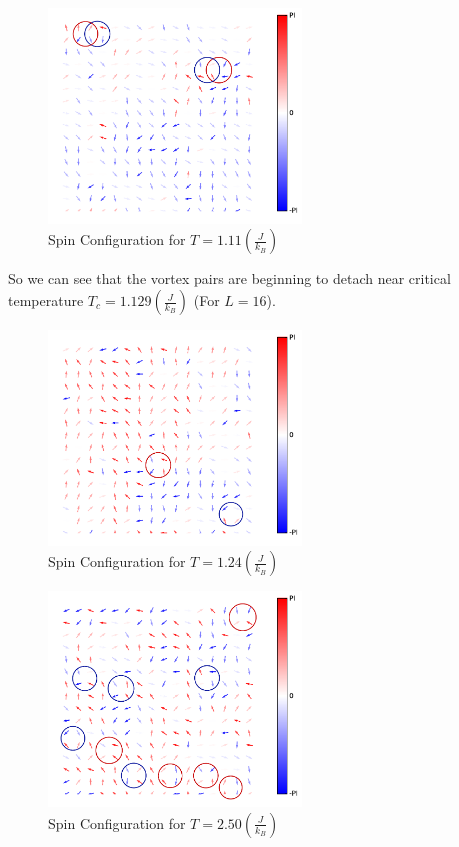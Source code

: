 \documentclass[a4paper]{article}
\begin{document}
\begin{figure}[H]
\centering
\includegraphics[width = 0.6\textwidth]{../vortex/XY-T1110.pdf}
\caption{Spin Configuration for $T = 1.11 (\displaystyle \frac{J}{k_B})$}
\end{figure}

So we can see that the vortex pairs are beginning to detach near critical temperature $T_c = 1.129 (\displaystyle \frac{J}{k_B})$ (For $L = 16$).

\begin{figure}[H]
\centering
\includegraphics[width = 0.6\textwidth]{../vortex/XY-T1236.pdf}
\caption{Spin Configuration for $T = 1.24 (\displaystyle \frac{J}{k_B})$}
\end{figure}

\begin{figure}[H]
\centering
\includegraphics[width = 0.6\textwidth]{../vortex/XY-T2500.pdf}
\caption{Spin Configuration for $T = 2.50 (\displaystyle \frac{J}{k_B})$}
\end{figure}
\end{document}
